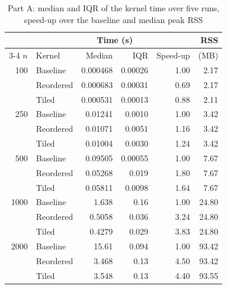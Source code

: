 \documentclass[conference,a4paper]{IEEEtran}
\begin{document}
\begin{table}[t]
  \centering
  \caption{Part A: median and IQR of the kernel time over five runs,
           speed-up over the baseline and median peak RSS}
  \label{tab:a-summary}
  \footnotesize
  \setlength{\tabcolsep}{4.5pt}
  \begin{tabular}{@{}rlrrrr@{}}
    \toprule
    & & \multicolumn{2}{c}{\textbf{Time (s)}} & & \textbf{RSS} \\
    \cmidrule(lr){3-4}
    $n$ & Kernel & Median & IQR & Speed-up & (MB) \\
    \midrule
    100  & Baseline  & 0.000468 & 0.00026 & 1.00 & 2.17 \\
         & Reordered & 0.000683 & 0.00031 & 0.69 & 2.17 \\
         & Tiled     & 0.000531 & 0.00013 & 0.88 & 2.11 \\
    \midrule
    250  & Baseline  & 0.01241 & 0.0010 & 1.00 & 3.42 \\
         & Reordered & 0.01071 & 0.0051 & 1.16 & 3.42 \\
         & Tiled     & 0.01004 & 0.0030 & 1.24 & 3.42 \\
    \midrule
    500  & Baseline  & 0.09505 & 0.00055 & 1.00 & 7.67 \\
         & Reordered & 0.05268 & 0.019 & 1.80 & 7.67 \\
         & Tiled     & 0.05811 & 0.0098 & 1.64 & 7.67 \\
    \midrule
    1000 & Baseline  & 1.638 & 0.16 & 1.00 & 24.80 \\
         & Reordered & 0.5058 & 0.036 & 3.24 & 24.80 \\
         & Tiled     & 0.4279 & 0.029 & 3.83 & 24.80 \\
    \midrule
    2000 & Baseline  & 15.61 & 0.094 & 1.00 & 93.42 \\
         & Reordered & 3.468 & 0.13 & 4.50 & 93.42 \\
         & Tiled     & 3.548 & 0.13 & 4.40 & 93.55 \\
    \bottomrule
  \end{tabular}
\end{table}
\end{document}
